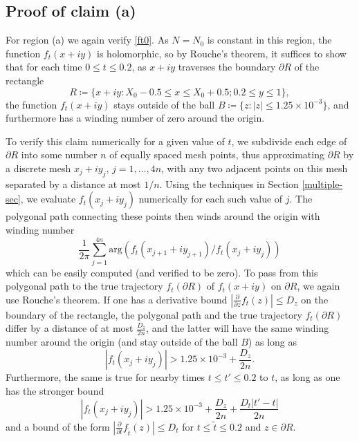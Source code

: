 \subsection{Proof of claim (a)}\label{barrier-sec}

For region (a) we again verify \eqref{ft0}.
As $N = N_0$ is constant in this region, the function $f_t(x+iy)$ is holomorphic, so by Rouche's theorem, it suffices to show that for each time $0 \leq t \leq 0.2$, as $x+iy$ traverses the boundary $\partial R$ of the rectangle 
$$ R \coloneqq \{ x+iy: X_0 - 0.5 \leq x \leq X_0 + 0.5; 0.2 \leq y \leq 1 \},$$
the function $f_t(x+iy)$ stays outside of the ball $B \coloneqq \{ z: |z| \leq 1.25 \times 10^{-3} \}$, and furthermore has a winding number of zero around the origin.

To verify this claim numerically for a given value of $t$, we subdivide each edge of $\partial R$ into some number $n$ of equally spaced mesh points, thus approximating $\partial R$ by a discrete mesh $x_j+iy_j$, $j=1,\dots,4n$, with any two adjacent points on this mesh separated by a distance at most $1/n$.  Using the techniques in Section \ref{multiple-sec}, we evaluate $f_t(x_j+iy_j)$ numerically for each such value of $j$.  The polygonal path connecting these points then winds around the origin with winding number
$$ \frac{1}{2\pi} \sum_{j=1}^{4n} \mathrm{arg}( f_t(x_{j+1}+iy_{j+1}) / f_t(x_j + i y_j) )$$
which can be easily computed (and verified to be zero).  To pass from this polygonal path to the true trajectory $f_t(\partial R)$ of $f_t(x+iy)$ on $\partial R$, we again use Rouche's theorem.  If one has a derivative bound $|\frac{\partial}{\partial z} f_t(z)| \leq D_z$ on the boundary of the rectangle, the polygonal path and the true trajectory $f_t(\partial R)$ differ by a distance of at most $\frac{D_z}{2n}$, and the latter will have the same winding number around the origin (and stay outside of the ball $B$) as long as
$$ |f_t(x_j + iy_j)| > 1.25 \times 10^{-3} + \frac{D_z}{2n}.$$
Furthermore, the same is true for nearby times $t \leq t' \leq 0.2$ to $t$, as long as one has the stronger bound
\begin{equation}\label{cond}
 |f_t(x_j + iy_j)| > 1.25 \times 10^{-3} + \frac{D_z}{2n} + \frac{D_t |t'-t|}{2n}
\end{equation}
and a bound of the form $|\frac{\partial}{\partial t} f_{\tilde t}(z)| \leq D_t$
for $t \leq \tilde t \leq 0.2$ and $z \in \partial R$.

